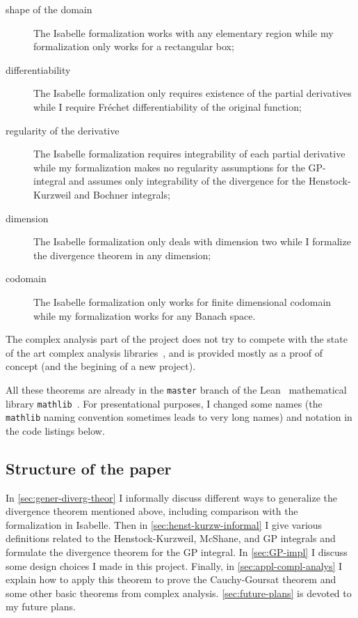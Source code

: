 \documentclass[a4paper, UKenglish,cleveref, autoref, thm-restate]{lipics-v2021}
\begin{document}
\begin{description}
\item[shape of the domain] The Isabelle formalization works with any
  elementary region while my formalization only works for a
  rectangular box;
\item[differentiability] The Isabelle formalization only requires
  existence of the partial derivatives while I require Fréchet
  differentiability of the original function;
\item[regularity of the derivative] The Isabelle formalization requires
  integrability of each partial derivative while my formalization
  makes no regularity assumptions for the GP-integral and assumes only
  integrability of the divergence for the Henstock-Kurzweil and
  Bochner integrals;
\item[dimension] The Isabelle formalization only deals with dimension two
  while I formalize the divergence theorem in any dimension;
\item[codomain] The Isabelle formalization only works for finite
  dimensional codomain while my formalization works for any Banach
  space.
\end{description}

The complex analysis part of the project does not try to compete with
the state of the art complex analysis
libraries~\cite{harrison-mizar,harrison-hol}, and is
provided mostly as a proof of concept (and the begining of a new
project).

All these theorems are already in the \texttt{master} branch of the
Lean~\cite{10.1007/978-3-319-21401-6_26} mathematical library
\texttt{mathlib}~\cite{mathlib20}. For presentational purposes, I
changed some names (the \texttt{mathlib} naming convention sometimes
leads to very long names) and notation in the code listings below.

\subsection{Structure of the paper}%
\label{sec:structure-paper}

In \autoref{sec:gener-diverg-theor} I informally discuss different
ways to generalize the divergence theorem mentioned above, including
comparison with the formalization in Isabelle. Then in
\autoref{sec:henst-kurzw-informal} I give various definitions related
to the Henstock-Kurzweil, McShane, and GP integrals and formulate the
divergence theorem for the GP integral. In \autoref{sec:GP-impl} I
discuss some design choices I made in this project. Finally, in
\autoref{sec:appl-compl-analys} I explain how to apply this theorem to
prove the Cauchy-Goursat theorem and some other basic theorems from
complex analysis. \autoref{sec:future-plans} is devoted to my future
plans.
\end{document}
